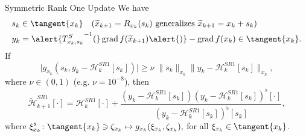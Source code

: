 \documentclass{beamer}
\begin{document}
\begin{frame}{Symmetric Rank One Update}
    We have
    \begin{align*}
        & s_k \in \tangent{x_k} \quad (\widetilde{x}_{k+1} = R_{x_k}(s_k) \text{ generalizes } \widetilde{x}_{k+1} = x_k + s_k) \\
        & y_k = \alert{{T^{S}_{x_k, s_k}}^{-1} (} \operatorname{grad}f(\widetilde{x}_{k+1}) \alert{)} - \operatorname{grad}f(x_k) \in \tangent{x_k}.
    \end{align*}
    If
    \begin{equation*}
        \lvert g_{x_k}(s_k, y_k - \mathcal{H}^{SR1}_k[s_k]) \rvert \geq \nu \; \lVert s_k \rVert_{x_k} \lVert y_k - \mathcal{H}^{SR1}_k[s_k] \rVert_{x_k},
    \end{equation*}
    where $\nu \in (0,1)$ (e.g. $\nu = 10^{-8}$), then
    \begin{equation*}
        \widetilde{\mathcal{H}}^{SR1}_{k+1} [\cdot] = \mathcal{H}^{SR1}_k [\cdot] + \frac{(y_k - \mathcal{H}^{SR1}_k [s_k]) (y_k - \mathcal{H}^{SR1}_k [s_k])^{\flat} [\cdot] }{(y_k - \mathcal{H}^{SR1}_k [s_k])^{\flat} [s_k]},
    \end{equation*}
    where $\xi^{\flat}_{x_k} \colon \tangent{x_k} \ni \zeta_{x_k} \mapsto g_{x_k}(\xi_{x_k}, \zeta_{x_k}),$ for all $\xi_{x_k} \in \tangent{x_k}$.
\end{frame}
\end{document}
